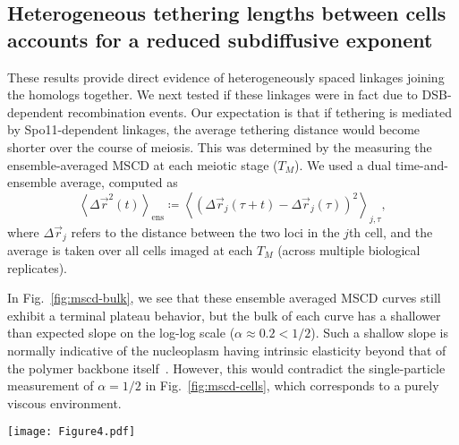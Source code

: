 \documentclass[9pt,twocolumn,twoside,lineno]{pnas-new}
\begin{document}
\subsection*{Heterogeneous tethering lengths between cells accounts for a reduced subdiffusive exponent} These results provide direct evidence of heterogeneously spaced linkages joining the homologs together. We next tested if these linkages were in fact due to DSB-dependent recombination events. Our expectation is that if tethering is mediated by Spo11-dependent linkages,
the average tethering distance would become shorter  over the course of meiosis. This was determined by the measuring the
ensemble-averaged MSCD at each meiotic stage ($T_M$).
We used a dual time-and-ensemble average, computed as
\[ \left\langle\Delta{}\vec{r}^2(t)\right\rangle_\text{ens}
 \coloneqq \left\langle \left(\Delta{}\vec{r}_j(\tau + t) - \Delta{}\vec{r}_j(\tau)\right)^2 \right\rangle_{j,\tau}, \]
where $\Delta{}\vec{r}_j$ refers to the distance between the two loci in the $j$th cell, and the average is taken over all cells imaged at each $T_M$ (across multiple biological replicates).

In Fig.~\ref{fig:mscd-bulk}, we see that these ensemble averaged
MSCD curves still exhibit a terminal plateau behavior, but the bulk of each
curve has a shallower than expected slope on the log-log scale ($\alpha
\approx 0.2 < 1/2$).
Such a shallow slope is normally indicative of the nucleoplasm having intrinsic elasticity beyond that of the polymer backbone itself~\cite{weber2010,weber2010a}.
However, this would contradict the single-particle measurement of $\alpha = 1/2$ in Fig.~\ref{fig:mscd-cells}, which corresponds to a purely viscous environment.





\begin{figure*}[t!]
\centering
\texttt{[image: Figure4.pdf]}
\caption{Time-and-ensemble averaged MSCDs at different times after induction of sporulation.
    (a) wild-type \textit{URA3} loci. A power-law slope of 0.2 is included for comparison.
    (b) \textit{spo11$\Delta$} strain, tagged at the \textit{URA3} locus.
    (c) Theoretical results for chromosomes with uniformly randomly spaced homologous linkages.
    (d) Approximate plateau levels, calculated from (a) and (b). The final five values of the MSCD were averaged to get an approximate confinement radius.
    TODO: MOVE TO NEW FIGURE:
    (a)/(b): The fraction of cells at each stage of meiosis ($T_M = T_0, T_1, \ldots$) that are observed to be in the ``mixed'' and ``paired'' states, respectively, for each of the two loci (see legend). Curves labelled ``WT'' correspond to wild-type strains and those labelled \textit{spo11$\Delta{}$} correspond to the mutant strain.}\label{fig:mscd-bulk}
\end{figure*}
\end{document}
